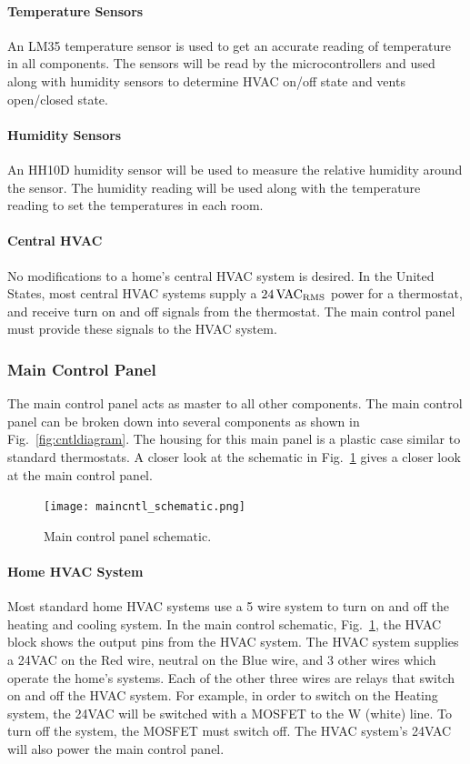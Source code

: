 \paragraph{Temperature Sensors}
\label{Temp Sensors}
An LM35 temperature sensor is used to get an accurate reading of temperature in all components. The sensors will be read by the microcontrollers and used along with humidity sensors to determine HVAC on/off state and vents open/closed state.
\paragraph{Humidity Sensors}
\label{humid_sensors}
An HH10D humidity sensor will be used to measure the relative humidity around the sensor.  The humidity reading will be used along with the temperature reading to set the temperatures in each room.

\paragraph{Central HVAC}
No modifications to a home's central HVAC system is desired.  In the United States, most central HVAC systems supply a $24\, \rm VAC_{RMS}$ power for a thermostat, and receive turn on and off signals from the thermostat.  The main control panel must provide these signals to the HVAC system.

\subsubsection{Main Control Panel}
The main control panel acts as master to all other components. The main control panel can be broken down into several components as shown in Fig.~\ref{fig:cntldiagram}. The housing for this main panel is a plastic case similar to standard thermostats. A closer look at the schematic in Fig.~\ref{fig:maincntl_schematic} gives a closer look at the main control panel.
\begin{figure}
\centering
\texttt{[image: maincntl\_schematic.png]}
\caption{Main control panel schematic.}
\label{fig:maincntl_schematic}
\end{figure}
\paragraph{Home HVAC System}
Most standard home HVAC systems use a 5 wire system to turn on and off the heating and cooling system. In the main control schematic, Fig.~\ref{fig:maincntl_schematic}, the HVAC block shows the output pins from the HVAC system. The HVAC system supplies a 24VAC on the Red wire, neutral on the Blue wire, and 3 other wires which operate the home's systems. Each of the other three wires are relays that switch on and off the HVAC system. For example, in order to switch on the Heating system, the 24VAC will be switched with a MOSFET to the W (white) line. To turn off the system, the MOSFET must switch off. The HVAC system's 24VAC will also power the main control panel.
